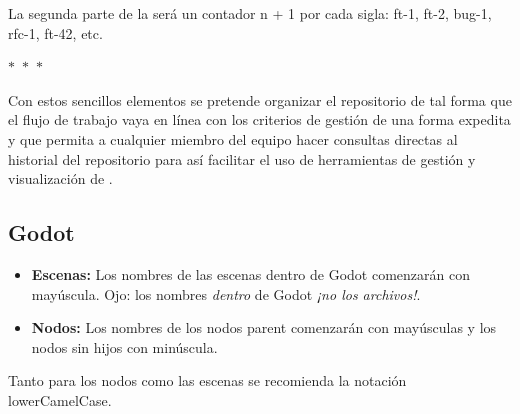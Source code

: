 La segunda parte de la  será un contador {n + 1} por cada sigla: ft-1, ft-2, bug-1, rfc-1, ft-42, etc.

 \begin{center}$\ast$~$\ast$~$\ast$\end{center}

Con estos sencillos elementos se pretende organizar el repositorio de tal forma que el flujo de trabajo vaya en línea con los criterios de gestión de una forma expedita y que permita a cualquier miembro del equipo hacer consultas directas al historial del repositorio para así facilitar el uso de herramientas de gestión y visualización de .


\subsection{Godot}

\begin{itemize}
\item \textbf{Escenas:} Los nombres de las escenas dentro de Godot comenzarán con mayúscula. Ojo: los nombres \emph{dentro} de Godot \emph{¡no los archivos!}.

\item \textbf{Nodos:} Los nombres de los nodos parent comenzarán con mayúsculas y los nodos sin hijos con minúscula.
\end{itemize}

\noindent Tanto para los nodos como las escenas se recomienda la notación lowerCamelCase.